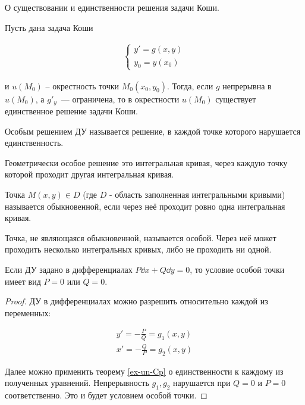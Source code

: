 
\begin{theorem}\label{ex-un-Cp}
  О существовании и единственности решения задачи Коши.

  Пусть дана задача Коши

  \begin{align*}
    \begin{cases}
      y' = g(x, y) \\
      y_{0} = y(x_{0})
    \end{cases}
  \end{align*}

  и \(u(M_{0})\) -- окрестность точки \(M_{0}(x_{0}, y_{0})\). Тогда, если
  \(g\) непрерывна в \(u(M_{0})\), а \(g'_{y}\)~--- ограничена, то в окрестности
  \(u(M_{0})\) существует единственное решение задачи Коши.
\end{theorem}

\begin{definition}
  Особым решением ДУ называется решение, в каждой точке которого нарушается
  единственность.
\end{definition}

\begin{remark}
  Геометрически особое решение это интегральная кривая, через каждую точку
  которой проходит другая интегральная кривая.
\end{remark}

\begin{definition}
  Точка \(M(x, y) \in D\) (где \(D\) - область заполненная интегральными
  кривыми) называется обыкновенной, если через неё проходит ровно одна
  интегральная кривая.
\end{definition}

\begin{definition}
  Точка, не являющаяся обыкновенной, называется особой. Через неё может
  проходить несколько интегральных кривых, либо не проходить ни одной.
\end{definition}

\begin{lemma}
  Если ДУ задано в дифференциалах \(P \dd x + Q \dd y = 0\), то условие особой
  точки имеет вид \(P = 0\) или \(Q = 0\).
\end{lemma}
\begin{proof}
  ДУ в дифференциалах можно разрешить относительно каждой из переменных:

  \begin{align*}
    y' = - \frac{P}{Q} = g_{1}(x, y) \\
    x' = - \frac{Q}{P} = g_{2}(x, y)
  \end{align*}

  Далее можно применить теорему \ref{ex-un-Cp} о единственности к каждому
  из полученных уравнений. Непрерывность \(g_{1}, g_{2}\) нарушается при
  \(Q = 0\) и \(P = 0\) соответственно. Это и будет условием особой точки.
\end{proof}
